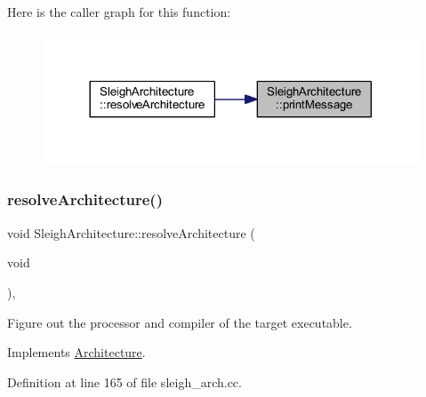 Here is the caller graph for this function\+:
\nopagebreak
\begin{figure}[H]
\begin{center}
\leavevmode
\includegraphics[width=317pt]{class_sleigh_architecture_a70cc8c22ebab95cf41ab21b7d886c08f_icgraph}
\end{center}
\end{figure}
\mbox{\label{class_sleigh_architecture_a937a743a8538c2cbfdb40926cd7bc7f8}} 
\subsubsection{\texorpdfstring{resolveArchitecture()}{resolveArchitecture()}}
{\footnotesize\ttfamily void Sleigh\+Architecture\+::resolve\+Architecture (\begin{DoxyParamCaption}\item[{void}]{ }\end{DoxyParamCaption})\hspace{0.3cm}{\ttfamily [protected]}, {\ttfamily [virtual]}}



Figure out the processor and compiler of the target executable. 



Implements \mbox{\hyperlink{class_architecture_aea7d061dab582340c8e9bb3323abdf4a}{Architecture}}.



Definition at line 165 of file sleigh\+\_\+arch.\+cc.

